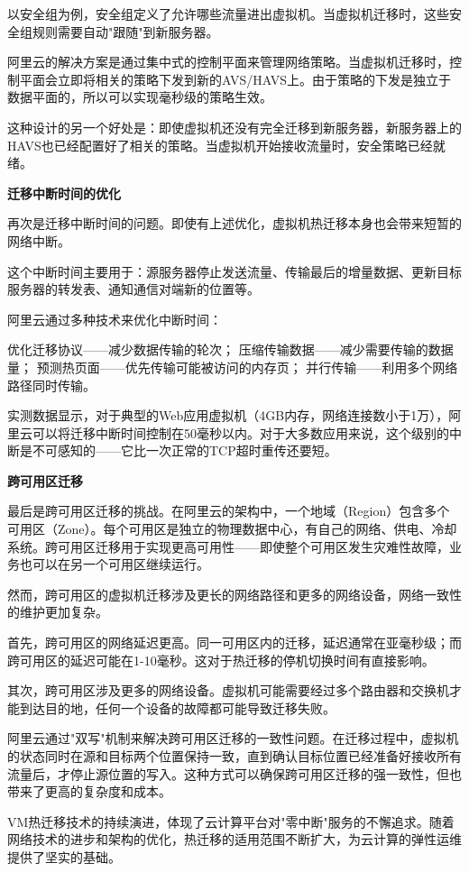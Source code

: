 以安全组为例，安全组定义了允许哪些流量进出虚拟机。当虚拟机迁移时，这些安全组规则需要自动"跟随"到新服务器。

阿里云的解决方案是通过集中式的控制平面来管理网络策略。当虚拟机迁移时，控制平面会立即将相关的策略下发到新的AVS/HAVS上。由于策略的下发是独立于数据平面的，所以可以实现毫秒级的策略生效。

这种设计的另一个好处是：即使虚拟机还没有完全迁移到新服务器，新服务器上的HAVS也已经配置好了相关的策略。当虚拟机开始接收流量时，安全策略已经就绪。

\textbf{迁移中断时间的优化}

再次是迁移中断时间的问题。即使有上述优化，虚拟机热迁移本身也会带来短暂的网络中断。

这个中断时间主要用于：源服务器停止发送流量、传输最后的增量数据、更新目标服务器的转发表、通知通信对端新的位置等。

阿里云通过多种技术来优化中断时间：

优化迁移协议——减少数据传输的轮次；
压缩传输数据——减少需要传输的数据量；
预测热页面——优先传输可能被访问的内存页；
并行传输——利用多个网络路径同时传输。

实测数据显示，对于典型的Web应用虚拟机（4GB内存，网络连接数小于1万），阿里云可以将迁移中断时间控制在50毫秒以内。对于大多数应用来说，这个级别的中断是不可感知的——它比一次正常的TCP超时重传还要短。

\textbf{跨可用区迁移}

最后是跨可用区迁移的挑战。在阿里云的架构中，一个地域（Region）包含多个可用区（Zone）。每个可用区是独立的物理数据中心，有自己的网络、供电、冷却系统。跨可用区迁移用于实现更高可用性——即使整个可用区发生灾难性故障，业务也可以在另一个可用区继续运行。

然而，跨可用区的虚拟机迁移涉及更长的网络路径和更多的网络设备，网络一致性的维护更加复杂。

首先，跨可用区的网络延迟更高。同一可用区内的迁移，延迟通常在亚毫秒级；而跨可用区的延迟可能在1-10毫秒。这对于热迁移的停机切换时间有直接影响。

其次，跨可用区涉及更多的网络设备。虚拟机可能需要经过多个路由器和交换机才能到达目的地，任何一个设备的故障都可能导致迁移失败。

阿里云通过"双写"机制来解决跨可用区迁移的一致性问题。在迁移过程中，虚拟机的状态同时在源和目标两个位置保持一致，直到确认目标位置已经准备好接收所有流量后，才停止源位置的写入。这种方式可以确保跨可用区迁移的强一致性，但也带来了更高的复杂度和成本。

VM热迁移技术的持续演进，体现了云计算平台对"零中断"服务的不懈追求。随着网络技术的进步和架构的优化，热迁移的适用范围不断扩大，为云计算的弹性运维提供了坚实的基础。

